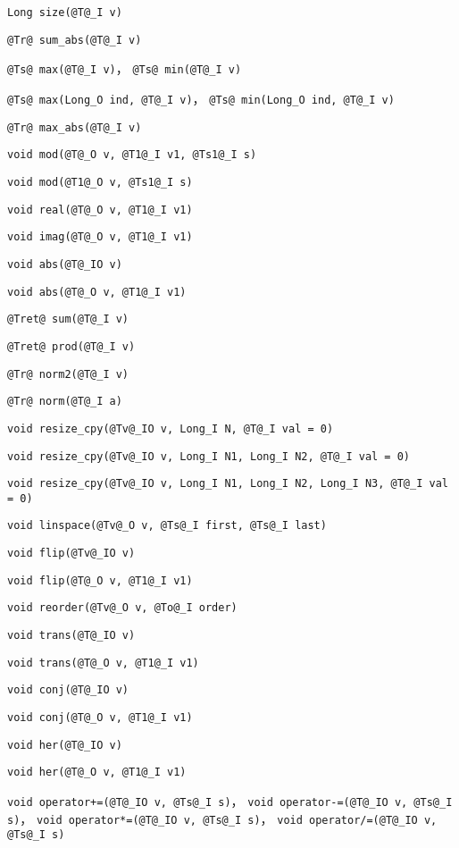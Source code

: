
\begin{issues}
\issueDraft
\end{issues}

\verb|Long size(@T@_I v)|

\verb|@Tr@ sum_abs(@T@_I v)|

\verb|@Ts@ max(@T@_I v)|， \verb|@Ts@ min(@T@_I v)|

\verb|@Ts@ max(Long_O ind, @T@_I v)|， \verb|@Ts@ min(Long_O ind, @T@_I v)|

\verb|@Tr@ max_abs(@T@_I v)|

\verb|void mod(@T@_O v, @T1@_I v1, @Ts1@_I s)|

\verb|void mod(@T1@_O v, @Ts1@_I s)|

\verb|void real(@T@_O v, @T1@_I v1)|

\verb|void imag(@T@_O v, @T1@_I v1)|

\verb|void abs(@T@_IO v)|

\verb|void abs(@T@_O v, @T1@_I v1)|

\verb|@Tret@ sum(@T@_I v)|

\verb|@Tret@ prod(@T@_I v)|

\verb|@Tr@ norm2(@T@_I v)|

\verb|@Tr@ norm(@T@_I a)|

\verb|void resize_cpy(@Tv@_IO v, Long_I N, @T@_I val = 0)|

\verb|void resize_cpy(@Tv@_IO v, Long_I N1, Long_I N2, @T@_I val = 0)|

\verb|void resize_cpy(@Tv@_IO v, Long_I N1, Long_I N2, Long_I N3, @T@_I val = 0)|

\verb|void linspace(@Tv@_O v, @Ts@_I first, @Ts@_I last)|

\verb|void flip(@Tv@_IO v)|

\verb|void flip(@T@_O v, @T1@_I v1)|

\verb|void reorder(@Tv@_O v, @To@_I order)|

\verb|void trans(@T@_IO v)|

\verb|void trans(@T@_O v, @T1@_I v1)|

\verb|void conj(@T@_IO v)|

\verb|void conj(@T@_O v, @T1@_I v1)|

\verb|void her(@T@_IO v)|

\verb|void her(@T@_O v, @T1@_I v1)|

\verb|void operator+=(@T@_IO v, @Ts@_I s)|， \verb|void operator-=(@T@_IO v, @Ts@_I s)|， \verb|void operator*=(@T@_IO v, @Ts@_I s)|， \verb|void operator/=(@T@_IO v, @Ts@_I s)|

